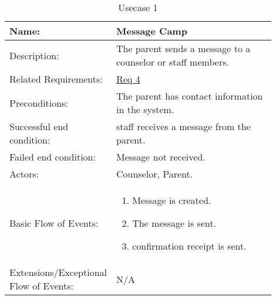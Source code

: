 \documentclass[11pt]{article}
\begin{document}
\begin{table}[!htb]
\caption{Usecase 1}
\label{des:message camp}	
\begin{center}
\begin{tabular}{p{0.30\linewidth}p{0.60\linewidth}}
	Name: & Message Camp\\\hline
	Description: & The parent sends a message to a counselor or staff members.\\\hline
	Related Requirements:& \hyperlink{Req4}{Req 4}\\\hline
	Preconditions:& The parent has contact information in the system.\\\hline
	Successful end condition:& staff receives a message from the parent.\\\hline
	Failed end condition:& Message not received. \\\hline
	Actors:& Counselor, Parent.\\\hline
	Basic Flow of Events: & \begin{enumerate}[topsep=0pt]
		\item Message is created.
		\item The message is sent.
		\item confirmation receipt is sent.
	\end{enumerate}\\\hline
	Extensions/Exceptional Flow of Events: & \vspace*{.25em}  N/A
\end{tabular}
\end{center}
\end{table}
\end{document}
